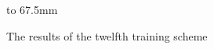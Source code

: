 \begin{figure}[H]
{    }
    \hspace{0mm}
    \hbox to 67.5mm{}%
    \caption{The results of the twelfth training scheme}
    \label{fig:training_scheme_12}
\end{figure}

